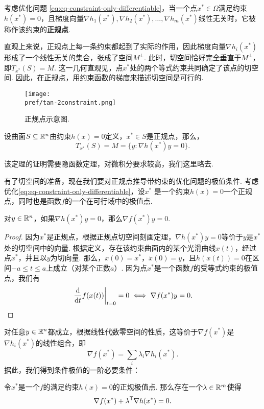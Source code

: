 \begin{definition}[正规点]\label{def:regular-point}
考虑优化问题 \eqref{eq:eq-constraint-only-differentiable}，当一个点${x^\ast}\in\Omega$满足约束${h(x^\ast)}=0$，且梯度向量$\nabla h_1({x^\ast}),\nabla h_2({x^\ast}),\dots,\nabla h_m({x^\ast})$线性无关时，它被称作该约束的\textbf{正规点}. 
\end{definition}

直观上来说，正规点上每一条约束都起到了实际的作用，因此梯度向量$\nabla h_i({x^\ast})$形成了一个线性无关的集合，张成了空间$M^\perp$. 此时，切空间恰好完全垂直于$M^\perp$，即$T_{x^\ast}(S)=M$. 这一几何直观见，点${x^\ast }$处的两个等式约束共同确定了该点的切空间. 因此，在正规点，用约束函数的梯度来描述切空间是可行的. 
    \begin{figure}
        \centering
        \texttt{[image: \\pref/tan-2constraint.png]}
        \caption{正规点示意图. }
        \label{fig:tan-2constraint}
    \end{figure}

\begin{theorem}[正规点切空间刻画定理]
设曲面$S\subseteq\mathbb{R}^n$由约束$h(x)=0$定义，${x^\ast}\in S$是正规点，那么，
\[T_{x^\ast}(S)=M=\{{y:\nabla h(x^\ast)y=0}\}.\]
\end{theorem}
该定理的证明需要隐函数定理，对微积分要求较高，我们这里略去.

有了切空间的准备，现在我们要对正规点推导带约束的优化问题的极值条件. 考虑优化\eqref{eq:eq-constraint-only-differentiable}，设$x^\ast$ 是一个约束${h(x)=0}$一个正规点，同时也是函数$f$的一个在可行域中的极值点.

\begin{lemma}\label{lemma:eq-opt-cond-1}
对$y\in\mathbb{R}^n$，如果$\nabla {h(x^\ast)y=0}$，那么$\nabla f({x^\ast}){y}=0$.
\end{lemma}

\begin{proof}
因为$x^\ast$是正规点，根据正规点切空间刻画定理，$\nabla h(x^*)y=0$等价于$y$是${x^\ast}$处的切空间中的向量. 根据定义，存在该约束曲面内的某个光滑曲线${x}(t)$，经过点${x^\ast}$，并且以$y$为切向量. 那么，${x}(0)={x^\ast}$，${\dot{x}}(0)={y}$，且${h(x(t))=0}$在区间$-a\le t\le a$上成立（对某个正数$a$）. 因为点${x^\ast}$是一个函数$f$的受等式约束的极值点，我们有
\[\left.\frac{\mathrm{d}}{\mathrm{d} t}f({x}(t))\right|_{t=0}=0\iff \nabla f({x^\ast})y=0.\]
\end{proof}

 对任意$y\in\mathbb{R}^n$都成立，根据线性代数零空间的性质，这等价于$\nabla f(x^*)$是$\nabla h_i(x^*)$的线性组合，即
\[\nabla f(x^*)=\sum_i\lambda_i\nabla h_i(x^*).\]
据此，我们得到条件极值的一阶必要条件：
\begin{theorem}[条件极值的一阶必要条件]\label{thm:eq-opt-cond-1}
    令${x^\ast}$是一个$f$的满足约束${h(x)=0}$的正规极值点. 那么存在一个${\lambda}\in \mathbb{R}^m$使得$$\nabla f({x^\ast})+{\lambda^{\mathsf{T}} \nabla h(x^\ast)=0}. $$
\end{theorem}

